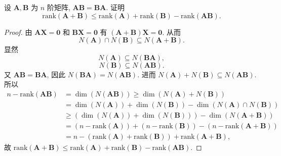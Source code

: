\documentclass[../../main.tex]{subfiles}%
\begin{document}
\begin{example}
设 $\boldsymbol{A},\boldsymbol{B}$ 为 $n$ 阶矩阵, $\boldsymbol{AB} = \boldsymbol{BA}$. 证明
\[
\mathrm{rank}(\boldsymbol{A} + \boldsymbol{B}) \leqslant \mathrm{rank}(\boldsymbol{A}) + \mathrm{rank}(\boldsymbol{B}) - \mathrm{rank}(\boldsymbol{AB}).
\]
\end{example}
\begin{proof}

由 $\boldsymbol{A}\boldsymbol{X} = \boldsymbol{0}$ 和 $\boldsymbol{B}\boldsymbol{X} = \boldsymbol{0}$ 有 $(\boldsymbol{A} + \boldsymbol{B})\boldsymbol{X} = \boldsymbol{0}$. 从而
\[
N(\boldsymbol{A}) \cap N(\boldsymbol{B}) \subseteq N(\boldsymbol{A} + \boldsymbol{B}).
\]
显然
\[
N(\boldsymbol{A}) \subseteq N(\boldsymbol{BA}),
\]
\[
N(\boldsymbol{B}) \subseteq N(\boldsymbol{AB}).
\]
又 $\boldsymbol{AB} = \boldsymbol{BA}$, 因此 $N(\boldsymbol{BA}) = N(\boldsymbol{AB})$. 进而 $N(\boldsymbol{A}) + N(\boldsymbol{B}) \subseteq N(\boldsymbol{AB})$. 所以
\begin{align*}
n - \mathrm{rank}(\boldsymbol{AB}) &= \dim (N(\boldsymbol{AB})) \geqslant \dim (N(\boldsymbol{A}) + N(\boldsymbol{B})) \\
&= \dim (N(\boldsymbol{A})) + \dim (N(\boldsymbol{B})) - \dim (N(\boldsymbol{A}) \cap N(\boldsymbol{B})) \\
&\geqslant (\dim (N(\boldsymbol{A})) + \dim (N(\boldsymbol{B}))) - \dim (N(\boldsymbol{A} + \boldsymbol{B})) \\
&= (n - \mathrm{rank}(\boldsymbol{A})) + (n - \mathrm{rank}(\boldsymbol{B})) - (n - \mathrm{rank}(\boldsymbol{A} + \boldsymbol{B})) \\
&= n - (\mathrm{rank}(\boldsymbol{A}) + \mathrm{rank}(\boldsymbol{B})) + \mathrm{rank}(\boldsymbol{A} + \boldsymbol{B}),
\end{align*}
故 $\mathrm{rank}(\boldsymbol{A} + \boldsymbol{B}) \leqslant \mathrm{rank}(\boldsymbol{A}) + \mathrm{rank}(\boldsymbol{B}) - \mathrm{rank}(\boldsymbol{AB})$.

\end{proof}
\end{document}
